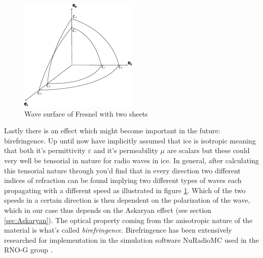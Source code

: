 \documentclass[11pt,a4paper,faculty=we,language=en,doctype=report]{cls/ugent-doc}
\begin{document}
\begin{figure}
  \centering
  \includegraphics[width=0.5\textwidth]{figures/Fresnel.pdf}
  \caption{Wave surface of Fresnel with two sheets}
  \label{fig:Fresnel}
\end{figure}
Lastly there is an effect which might become important in the future:
birefringence.  Up until now have implicitly assumed that ice is isotropic
meaning that both it's permittivity $\varepsilon$ and it's permeability $\mu$
are scalars but these could very well be tensorial in nature for radio waves in
ice. In general, after calculating this tensorial nature through you'd find
that in every direction two different indices of refraction can be found
implying two different types of waves each propagating with a different speed
as illustrated in figure \ref{fig:Fresnel}. Which of the two speeds in a
certain direction is then dependent on the polarization of the wave, which in
our case thus depends on the Askaryan effect (see section \ref{sec:Askaryan}).
The optical property coming from the anisotropic nature of the material is
what's called \textit{birefringence}.  Birefringence has been extensively
researched for implementation in the simulation software NuRadioMC used in the
RNO-G group \cite{Heyer2023}.
\end{document}
